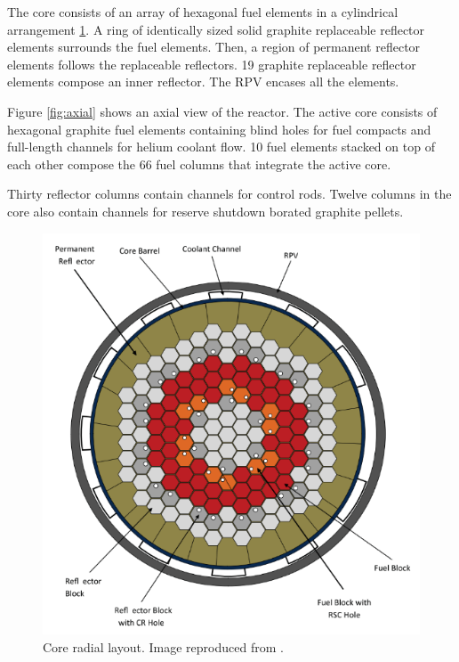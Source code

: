 \documentclass{anstrans}
\begin{document}
The core consists of an array of hexagonal fuel elements in a cylindrical arrangement \ref{fig:radial}.
A ring of identically sized solid graphite replaceable reflector elements surrounds the fuel elements.
Then, a region of permanent reflector elements follows the replaceable reflectors.
19 graphite replaceable reflector elements compose an inner reflector.
The RPV encases all the elements.

Figure \ref{fig:axial} shows an axial view of the reactor.
The active core consists of hexagonal graphite fuel elements containing blind holes for fuel compacts and full-length channels for helium coolant flow.
10 fuel elements stacked on top of each other compose the 66 fuel columns that integrate the active core.

Thirty reflector columns contain channels for control rods.
Twelve columns in the core also contain channels for reserve shutdown borated graphite pellets.

\begin{figure}[htbp!] %
	\centering
	\includegraphics[width=0.95\linewidth]{figures/radial-layout.png}
	\hfill
	\caption{Core radial layout. Image reproduced from \cite{oecd_nea_benchmark_2017}.}
	\label{fig:radial}
\end{figure}
\end{document}
